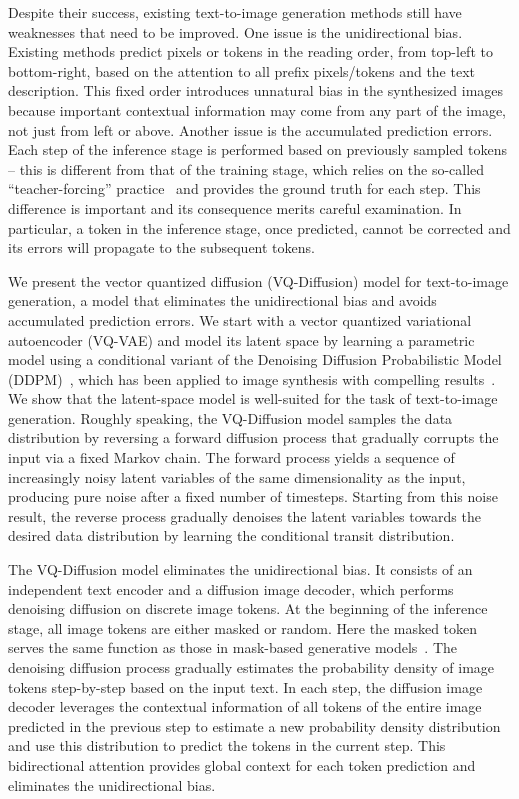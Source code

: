 Despite their success, existing text-to-image generation methods still have weaknesses that need to be improved. One issue is the unidirectional bias. Existing methods predict pixels or tokens in the reading order, from top-left to bottom-right, based on the attention to all prefix pixels/tokens and the text description. This fixed order introduces unnatural bias in the synthesized images because important contextual information may come from any part of the image, not just from left or above. Another issue is the accumulated prediction errors. Each step of the inference stage is performed based on previously sampled tokens – this is different from that of the training stage, which relies on the so-called “teacher-forcing” practice~\cite{esser2021imagebart} and provides the ground truth for each step. This difference is important and its consequence merits careful examination. In particular, a token in the inference stage, once predicted, cannot be corrected and its errors will propagate to the subsequent tokens.

We present the vector quantized diffusion (VQ-Diffusion) model for text-to-image generation, a model that eliminates the unidirectional bias and avoids accumulated prediction errors. We start with a vector quantized variational autoencoder (VQ-VAE) and model its latent space by learning a parametric model using a conditional variant of the Denoising Diffusion Probabilistic Model (DDPM)~\cite{sohl2015deep,ho2020denoising}, which has been applied to image synthesis with compelling results~\cite{dhariwal2021diffusion}. We show that the latent-space model is well-suited for the task of text-to-image generation. Roughly speaking, the VQ-Diffusion model samples the data distribution by reversing a forward diffusion process that gradually corrupts the input via a fixed Markov chain. The forward process yields a sequence of increasingly noisy latent variables of the same dimensionality as the input, producing pure noise after a fixed number of timesteps. Starting from this noise result, the reverse process gradually denoises the latent variables towards the desired data distribution by learning the conditional transit distribution.

The VQ-Diffusion model eliminates the unidirectional bias. It consists of an independent text encoder and a diffusion image decoder, which performs denoising diffusion on discrete image tokens. At the beginning of the inference stage, all image tokens are either masked or random. Here the masked token serves the same function as those in mask-based generative models~\cite{devlin2018bert}. The denoising diffusion process gradually estimates the probability density of image tokens step-by-step based on the input text. In each step, the diffusion image decoder leverages the contextual information of all tokens of the entire image predicted in the previous step to estimate a new probability density distribution and use this distribution to predict the tokens in the current step. This bidirectional attention provides global context for each token prediction and eliminates the unidirectional bias.


